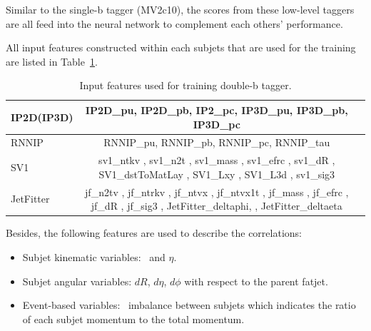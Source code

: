 \par Similar to the single-b tagger (MV2c10), the scores from these low-level taggers are all feed into the neural network to complement each others’ performance.

All input features constructed within each subjets that are used for the training are listed in Table~\ref{tab:input}.
\begin{table}[tbh]
\centering
\scriptsize
\begin{tabular}{|l|c|c}

\hline
 IP2D(IP3D)& IP2D\_pu, IP2D\_pb, IP2\_pc, IP3D\_pu, IP3D\_pb, IP3D\_pc\\
 \hline
RNNIP& RNNIP\_pu, RNNIP\_pb, RNNIP\_pc, RNNIP\_tau 	\\		
	 \hline					
SV1 & sv1\_ntkv
, sv1\_n2t				
, sv1\_mass
, sv1\_efrc
, sv1\_dR
, SV1\_dstToMatLay
, SV1\_Lxy
, SV1\_L3d
, sv1\_sig3 		\\ 	
 \hline
 	 		
JetFitter & jf\_n2tv , jf\_ntrkv , jf\_ntvx , jf\_ntvx1t , jf\_mass
, jf\_efrc
, jf\_dR
, jf\_sig3
, JetFitter\_deltaphi, , JetFitter\_deltaeta\\
 \hline
\end{tabular}
\caption{Input features used for training double-b tagger.}
\label{tab:input}

\end{table}

\par Besides, the following features are used to describe the correlations:
\begin{itemize}


\item Subjet kinematic variables: \pt~and $\eta$.
\item Subjet angular variables: $d R$, $d\eta$, $d\phi$ with respect to the parent fatjet.
\item Event-based variables: \pt~imbalance between subjets which indicates the ratio of each subjet momentum to the total momentum.
\end{itemize}




